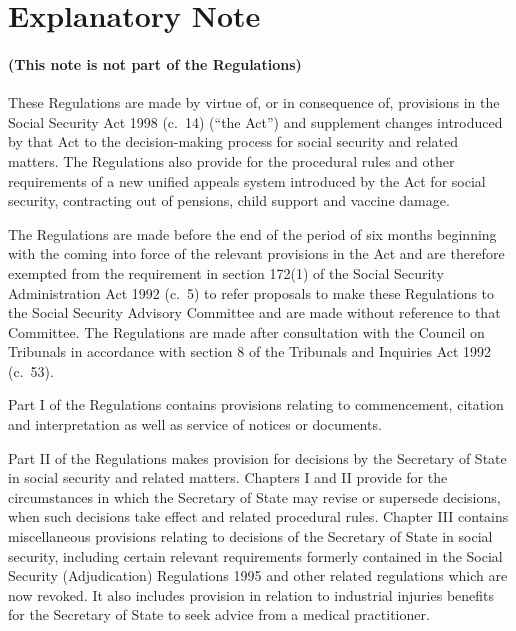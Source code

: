 \documentclass[12pt,a4paper]{article}
\begin{document}
\part{Explanatory Note}

\renewcommand\parthead{--- Explanatory Note}

\subsection*{(This note is not part of the Regulations)}

 These Regulations are made by virtue of, or in consequence of, provisions in the Social Security Act 1998 (c.\ 14) (“the Act”) and supplement changes introduced by that Act to the decision-making process for social security and related matters. The Regulations also provide for the procedural rules and other requirements of a new unified appeals system introduced by the Act for social security, contracting out of pensions, child support and vaccine damage.

  The Regulations are made before the end of the period of six months beginning with the coming into force of the relevant provisions in the Act and are therefore exempted from the requirement in section 172(1) of the Social Security Administration Act 1992 (c.\ 5) to refer proposals to make these Regulations to the Social Security Advisory Committee and are made without reference to that Committee. The Regulations are made after consultation with the Council on Tribunals in accordance with section 8 of the Tribunals and Inquiries Act 1992 (c.\ 53).

  Part I of the Regulations contains provisions relating to commencement, citation and interpretation as well as service of notices or documents.

  Part II of the Regulations makes provision for decisions by the Secretary of State in social security and related matters. Chapters I and II provide for the circumstances in which the Secretary of State may revise or supersede decisions, when such decisions take effect and related procedural rules. Chapter III contains miscellaneous provisions relating to decisions of the Secretary of State in social security, including certain relevant requirements formerly contained in the Social Security (Adjudication) Regulations 1995 and other related regulations which are now revoked. It also includes provision in relation to industrial injuries benefits for the Secretary of State to seek advice from a medical practitioner.
\end{document}

